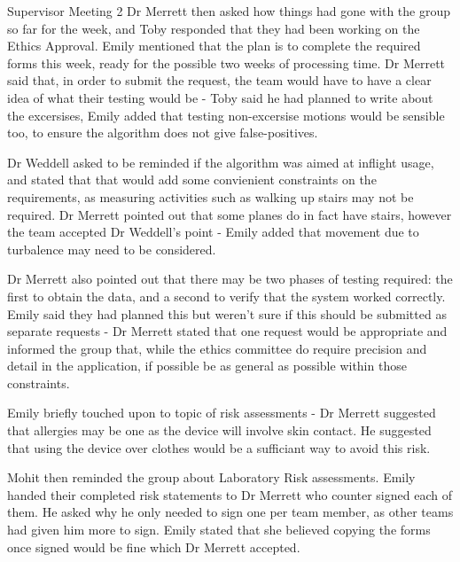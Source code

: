 \documentclass{article}
\begin{document}
\begin{Minutes}{Supervisor Meeting 2}
Dr Merrett then asked how things had gone with the group so far for the week, and Toby responded
that they had been working on the Ethics Approval. Emily mentioned that the plan is to complete
the required forms this week, ready for the possible two weeks of processing time. Dr Merrett
said that, in order to submit the request, the team would have to have a clear idea of what their
testing would be - Toby said he had planned to write about the excersises, Emily added that testing
non-excersise motions would be sensible too, to ensure the algorithm does not give false-positives.

Dr Weddell asked to be reminded if the algorithm was aimed at inflight usage, and stated that that
would add some convienient constraints on the requirements, as measuring activities such as walking
up stairs may not be required. Dr Merrett pointed out that some planes do in fact have stairs,
however the team accepted Dr Weddell's point - Emily added that movement due to turbalence may
need to be considered.

Dr Merrett also pointed out that there may be two phases of testing required: the first to obtain
the data, and a second to verify that the system worked correctly. Emily said they had planned this
but weren't sure if this should be submitted as separate requests - Dr Merrett stated that one
request would be appropriate and informed the group that, while the ethics committee do require
precision and detail in the application, if possible be as general as possible within those
constraints.

Emily briefly touched upon to topic of risk assessments - Dr Merrett suggested that allergies may
be one as the device will involve skin contact. He suggested that using the device over clothes
would be a sufficiant way to avoid this risk.

Mohit then reminded the group about Laboratory Risk assessments. Emily handed their completed
risk statements to Dr Merrett who counter signed each of them. He asked why he only needed to sign
one per team member, as other teams had given him more to sign. Emily stated that she believed
copying the forms once signed would be fine which Dr Merrett accepted.

\end{Minutes}
\end{document}
